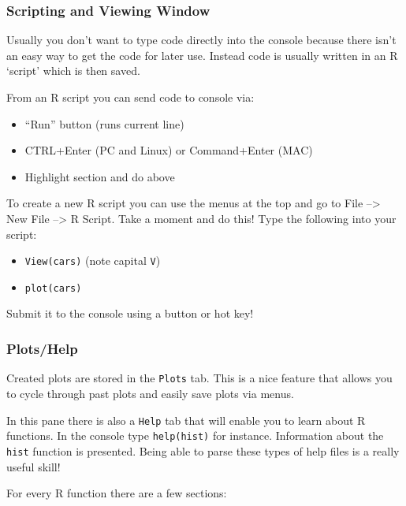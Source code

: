 \documentclass[
]{book}
\theoremstyle{definition}
\theoremstyle{definition}
\theoremstyle{definition}
\theoremstyle{remark}
\begin{document}
\hypertarget{scripting-and-viewing-window}{%
\subsubsection{Scripting and Viewing Window}\label{scripting-and-viewing-window}}

Usually you don't want to type code directly into the console because there isn't an easy way to get the code for later use. Instead code is usually written in an R `script' which is then saved.

From an R script you can send code to console via:

\begin{itemize}
\item
  ``Run'' button (runs current line)
\item
  CTRL+Enter (PC and Linux) or Command+Enter (MAC)
\item
  Highlight section and do above
\end{itemize}

To create a new R script you can use the menus at the top and go to File --\textgreater{} New File --\textgreater{} R Script. Take a moment and do this! Type the following into your script:

\begin{itemize}
\item
  \texttt{View(cars)} (note capital \texttt{V})
\item
  \texttt{plot(cars)}
\end{itemize}

Submit it to the console using a button or hot key!

\hypertarget{plotshelp}{%
\subsubsection{Plots/Help}\label{plotshelp}}

Created plots are stored in the \texttt{Plots} tab. This is a nice feature that allows you to cycle through past plots and easily save plots via menus.

In this pane there is also a \texttt{Help} tab that will enable you to learn about R functions. In the console type \texttt{help(hist)} for instance. Information about the \texttt{hist} function is presented. Being able to parse these types of help files is a really useful skill!

For every R function there are a few sections:
\end{document}
